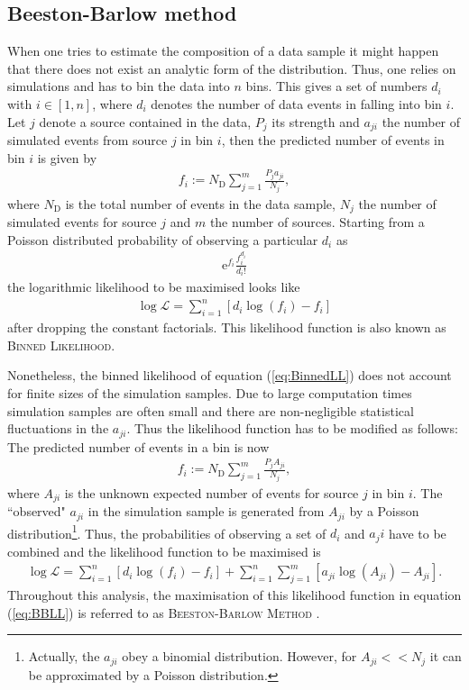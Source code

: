 \subsection{Beeston-Barlow method}
\label{sec:BeestonBarlow}
When one tries to estimate the composition of a data sample it might happen that there does not exist an analytic form of the distribution.
Thus, one relies on simulations and has to bin the data into $n$ bins.
This gives a set of numbers ${d_i}$ with $i \in [1,n]$, where $d_i$ denotes the number of data events in falling into bin $i$.
Let $j$ denote a source contained in the data, $P_j$ its strength and $a_{ji}$ the number of simulated events from source $j$ in bin $i$, then the predicted number of events in bin $i$ is given by
\begin{align}
    f_i := N_\text{D} \sum_{j=1}^{m} \frac{P_j a_{ji}}{N_j},
\end{align}
where $N_\text{D}$ is the total number of events in the data sample, $N_j$ the number of simulated events for source $j$ and $m$ the number of sources.
Starting from a Poisson distributed probability of observing a particular $d_i$ as
\begin{align}
    \mathrm{e}^{f_i} \frac{f_i^{d_i}}{d_i!}
\end{align}
the logarithmic likelihood to be maximised looks like
\begin{align}
    \log \mathcal{L} = \sum_{i=1}^{n} \left[d_i \log(f_i) - f_i\right] \label{eq:BinnedLL}
\end{align}
after dropping the constant factorials.
This likelihood function is also known as \textsc{Binned Likelihood}.

Nonetheless, the binned likelihood of equation (\ref{eq:BinnedLL}) does not account for finite sizes of the simulation samples.
Due to large computation times simulation samples are often small and there are non-negligible statistical fluctuations in the $a_{ji}$.
Thus the likelihood function has to be modified as follows:
The predicted number of events in a bin is now
\begin{align}
    f_i := N_\text{D} \sum_{j=1}^{m} \frac{P_j A_{ji}}{N_j},
\end{align}
where $A_{ji}$ is the unknown expected number of events for source $j$ in bin $i$.
The ``observed" $a_{ji}$ in the simulation sample is generated from $A_{ji}$ by a Poisson distribution\footnote{Actually, the $a_{ji}$ obey a binomial distribution. However, for $A_{ji} << N_j$ it can be approximated by a Poisson distribution.}.
Thus, the probabilities of observing a set of ${d_i}$ and ${a_ji}$ have to be combined and the likelihood function to be maximised is
\begin{align}
    \log \mathcal{L} = \sum_{i=1}^{n} \left[d_i \log(f_i) - f_i\right] + \sum_{i=1}^{n} \sum_{j=1}^{m} \left[a_{ji} \log(A_{ji}) - A_{ji}\right]. \label{eq:BBLL}
\end{align}
Throughout this analysis, the maximisation of this likelihood function in equation (\ref{eq:BBLL}) is referred to as \textsc{Beeston-Barlow Method} \cite{BeestonBarlow}.
